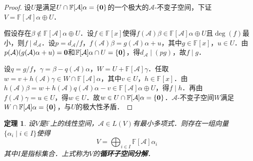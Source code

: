 \documentclass[a4paper,fontset=windows]{ctexbook}
\newtheorem{theorem}{定理}[chapter]
\theoremstyle{definition}
\begin{document}
\begin{proof}
设$U$是满足$U\cap\mathbb{F}[\mathcal{A}]\alpha=\{{\bf 0}\}$的一个极大的$\mathcal{A}$-不变子空间，下证$V=\mathbb{F}[\mathcal{A}]\alpha\oplus U$．

假设存在$\beta\notin\mathbb{F}[\mathcal{A}]\alpha\oplus U$．设$f\in\mathbb{F}[x]$使得$f(\mathcal{A})\beta\in\mathbb{F}[\mathcal{A}]\alpha\oplus U$且$\deg(f)$最小，则$f\mid d_{\mathcal{A}}$．设$p=d_{\mathcal{A}}/f$，$f(\mathcal{A})\beta=g(\mathcal{A})\alpha+u$，其中$g\in\mathbb{F}[x]$，$u\in U$．由$p(\mathcal{A})(g(\mathcal{A})\alpha+u)={\bf 0}$和$\mathbb{F}[\mathcal{A}]\alpha\cap U=\{\bf 0\}$，得$d_{\mathcal{A}}\mid(pg)$，故$f\mid g$．

设$q=g/f$，$\gamma=\beta-q(\mathcal{A})\alpha$，$W=U+\mathbb{F}[\mathcal{A}]\gamma$．任取$w=v+h(\mathcal{A})\gamma\in W\cap\mathbb{F}[\mathcal{A}]\alpha$，其中$v\in U$，$h\in\mathbb{F}[x]$．由$h(\mathcal{A})\beta=w+h(\mathcal{A})q(\mathcal{A})\alpha-v\in\mathbb{F}[\mathcal{A}]\alpha\oplus U$，得$f\mid h$．再由$f(\mathcal{A})\gamma=u\in U$，得$w\in U$．故$w\in U\cap\mathbb{F}[\mathcal{A}]\alpha=\{\bf 0\}$．$\mathcal{A}$-不变子空间$W$满足$W\cap\mathbb{F}[\mathcal{A}]\alpha=\{\bf 0\}$，与$U$的极大性矛盾．
\end{proof}

\begin{theorem}
设$V$是$\mathbb{F}$上的线性空间，$\mathcal{A}\in L(V)$有最小多项式．则存在一组向量$\{\alpha_i\mid i\in I\}$使得
$$V=\bigoplus_{i\in I}\mathbb{F}[\mathcal{A}]\alpha_i$$
其中$I$是指标集合．上式称为$V$的{\bf 循环子空间分解}．
\end{theorem}
\end{document}
